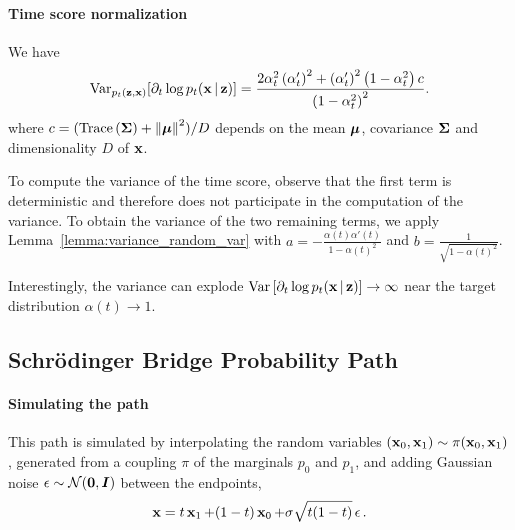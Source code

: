 \paragraph{Time score normalization}
We have
\begin{align}
    \mathrm{Var}_{p_t(\operatorname{\mathbf{z}}, \operatorname{\mathbf{x}})}[
    \partial_{t}\log p_{t}(\operatorname{\mathbf{x}}|\operatorname{\mathbf{z}})
    ]
    = \frac{
    2\alpha_{t}^{2}\left(\alpha'_{t}\right)^{2}
    +
    \left(\alpha'_{t}\right)^{2}\left(1-\alpha_{t}^{2}\right)c
    }
    {
    \left(1-\alpha_{t}^{2}\right)^{2}
    }.
\end{align}
where $c = (\text{Trace}\left({\bm{\Sigma}}\right)+ \norm{\operatorname{\bm{\mu}}}^{2})/D$ depends on the mean $\operatorname{\bm{\mu}}$, covariance ${\bm{\Sigma}}$ and dimensionality $D$ of $\operatorname{\mathbf{x}}$. 

To compute the variance of the time score, observe that the first term is deterministic and therefore does not participate in the computation of the variance. To obtain the variance of the two remaining terms, we apply Lemma~\ref{lemma:variance_random_var} with $a=-\frac{\alpha(t)\alpha'(t)}{1-\alpha(t)^{2}}$ and $b=\frac{1}{\sqrt{1-\alpha(t)^{2}}}$. 

Interestingly, the variance can explode $\mathrm{Var}\left[\partial_{t}\log p_{t}(\operatorname{\mathbf{x}}|\operatorname{\mathbf{z}})\right] \rightarrow \infty$ near the target distribution $\alpha(t) \rightarrow 1$.





\subsection{Schrödinger Bridge Probability Path}
\label{app:ssec:schrodinger_bridge_path}

\paragraph{Simulating the path}
This path is simulated by interpolating the random variables $(\operatorname{\mathbf{x}}_0, \operatorname{\mathbf{x}}_1) \sim \pi(\operatorname{\mathbf{x}}_0, \operatorname{\mathbf{x}}_1)$, generated from a coupling $\pi$ of the marginals $p_0$ and $p_1$, and adding Gaussian noise $\operatorname{\mathbf{\epsilon}} \sim \mathcal{N}(\operatorname{\mathbf{0}}, {\bm{I}})$ between the endpoints,
\begin{align}
    \operatorname{\mathbf{x}}
    = 
    t \operatorname{\mathbf{x}}_1 
    +
    (1 - t) \operatorname{\mathbf{x}}_0
    +
    \sigma \sqrt{t (1 - t)}
    \operatorname{\mathbf{\epsilon}}.
\end{align}
